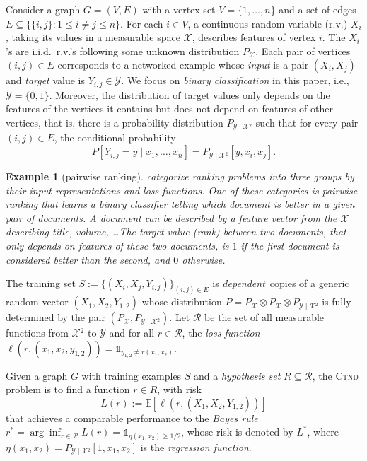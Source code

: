 \documentclass[letterpaper]{article} %
\newtheorem{example}{Example}
\newcommand{\E}{\mathbb{E}}
\newcommand{\indicator}{\mathds 1}
\newcommand{\xspace}{\mathcal{X}}
\newcommand{\yspace}{\mathcal{Y}}
\newcommand{\bayeserror}{L^*}
\newcommand{\distribution}{P}
\newcommand{\risk}{L}
\newcommand{\edge}[1]{\{#1\}}
\newcommand{\pair}[1]{(#1)}
\newcommand{\problemabbr}{\textnormal{C}\textsc{tnd}}
\newcommand{\trainingset}{S}
\begin{document}
Consider a graph $G=(V,E)$ with a vertex set $V=\{1,\dots,n\}$ and a set of edges $E\subseteq\{\edge{i,j}: 1\le i\neq j\le n\}$. 
For each $i\in V$, a continuous random variable (r.v.) $X_i$, taking its values in a measurable space $\xspace{}$, describes features of vertex $i$. The $X_i$'s are i.i.d.\ r.v.'s following some unknown distribution $P_\xspace$.
Each pair of vertices $\pair{i,j}\in E$ corresponds to a networked example whose \emph{input} is a pair $(X_i,X_j)$ and \emph{target} value is $Y_{i,j}\in\yspace{}.$ 
We focus on \emph{binary classification} in this paper, i.e., $\yspace{} = \{0,1\}$. 
Moreover, the distribution of target values only depends on the features of the vertices it contains but does not depend on features of other vertices, that is, there is a probability distribution $P_{\yspace{}\mid\xspace{}^2}$ such that for every pair $\pair{i,j}\in E$, the conditional probability 
\[P\left[Y_{i,j}=y\mid x_1,\ldots,x_n\right]=P_{\yspace{}\mid\xspace{}^2}\left[y,x_i,x_j\right].\]  

\begin{example}[pairwise ranking]
\cite{liu2009learning} categorize ranking problems into three groups by their input representations and loss functions. One of these categories is \emph{pairwise ranking} that learns a binary classifier telling which document is better in a given pair of documents. A document can be described by a feature vector from the $\xspace$ describing title, volume, \ldots The target value (rank) between two documents, that only depends on features of these two documents, is $1$ if the first document is considered better than the second, and $0$ otherwise. 
\end{example}

The training set $\trainingset:=\{(X_i,X_j,Y_{i,j})\}_{\pair{i,j}\in E}$ is \emph{dependent}\ copies of a generic random vector $(X_1, X_2, Y_{1,2})$ whose distribution $\distribution{}=P_\xspace\otimes P_\xspace\otimes P_{\yspace{}\mid\xspace{}^2}$ is fully determined by the pair $(P_\xspace{}, P_{\yspace{}\mid\xspace{}^2})$. 
Let $\mathcal{R}$ be the set of all measurable functions from $\xspace{}^2$ to $\yspace{}$ and for all $r\in\mathcal{R}$, the \emph{loss function} $\ell(r,(x_1,x_2,y_{1,2}))=\indicator_{y_{1,2}\neq r(x_1,x_2)}$. 

Given a graph $G$ with training examples $\trainingset$ and a \emph{hypothesis set}  $R\subseteq\mathcal{R}$, the \problemabbr{} problem is to find a function $r\in R$, with risk
\begin{equation}
    \label{eq:graph_reconstruction_risk}
    \risk(r) := \E[\ell(r, (X_1,X_2,Y_{1,2}))]
\end{equation}
that achieves a comparable performance to the \emph{Bayes rule} $r^*=\arg\inf_{r\in\mathcal{R}}\risk(r) = \indicator_{\eta(x_1,x_2)\ge 1/2}$, whose risk is denoted by $\bayeserror{}$, where $\eta(x_1,x_2)=P_{\yspace{}\mid\xspace{}^2}[1,x_1,x_2]$ is the \emph{regression function}. 
\end{document}
